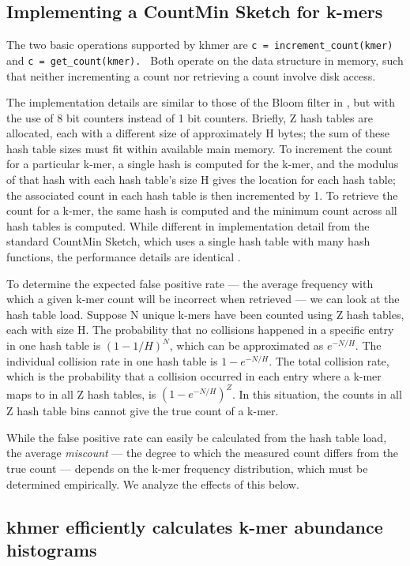 \documentclass{article}
\begin{document}
\subsection{Implementing a CountMin Sketch for k-mers}

The two basic operations supported by khmer are {\tt c =
  increment\_count(kmer) } and {\tt c = get\_count(kmer). }
Both operate on the data structure in memory, such that neither
incrementing a count nor retrieving a count involve disk
access.

The implementation details are similar to those of the Bloom filter in
\cite{Pell2012}, but with the use of 8 bit counters instead of 1 bit
counters.  Briefly, Z hash tables are allocated, each with a different
size of approximately H bytes; the sum of these hash table sizes must
fit within available main memory.  To increment the count for a
particular k-mer, a single hash is computed for the k-mer, and the
modulus of that hash with each hash table's size H gives the location
for each hash table; the associated count in each hash table is then
incremented by 1.  To retrieve the count for a k-mer, the same hash is
computed and the minimum count across all hash tables is computed.
While different in implementation detail from the standard CountMin Sketch,
which uses a single hash table with many hash
functions, the performance details are identical \cite{Pell2012}.

To determine the expected false positive rate --- the average frequency
with which a given k-mer count will be incorrect when retrieved --- we
can look at the hash table load. Suppose N unique k-mers have been
counted using Z hash tables, each with size H.  The probability that
no collisions happened in a specific entry in one hash table is
$(1-1/H)^{N}$, which can be approximated as $e^{-N/H}$. The individual
collision rate in one hash table is $1-e^{-N/H}$. The total collision
rate, which is the probability that a collision occurred in each entry
where a k-mer maps to in all Z hash tables, is $(1-e^{-N/H})^{Z}$. In
this situation, the counts in all Z hash table bins cannot give the
true count of a k-mer.

While the false positive rate can easily be calculated from the hash
table load, the average {\em miscount} --- the degree to which the measured count
differs from the true count --- depends on the k-mer frequency
distribution, which must be determined empirically.  We analyze the
effects of this below.

\subsection{khmer efficiently calculates k-mer abundance histograms}
\end{document}
